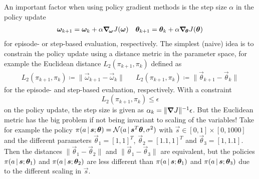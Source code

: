 			An important factor when using policy gradient methods is the step size \(\alpha\) in the policy update
			\begin{align*}
				\bm{\omega}_{k + 1} = \bm{\omega}_k + \alpha \grad_{\!\bm{\omega}} J(\bm{\omega})
				 &  &
				\bm{\theta}_{k + 1} = \bm{\theta}_k + \alpha \grad_{\!\bm{\theta}} J(\bm{\theta})
			\end{align*}
			for episode- or step-based evaluation, respectively. The simplest (naive) idea is to constrain the policy update using a distance metric in the parameter space, for example the Euclidean distance \( L_2(\pi_{k + 1}, \pi_k) \) defined as
			\begin{align*}
				L_2(\pi_{k + 1}, \pi_k) \coloneqq \lVert \vec{\omega}_{k + 1} - \vec{\omega}_k \rVert
				 &  &
				L_2(\pi_{k + 1}, \pi_k) \coloneqq \lVert \vec{\theta}_{k + 1} - \vec{\theta}_k \rVert
			\end{align*}
			for the episode- and step-based evaluation, respectively. With a constraint
			\begin{equation*}
				L_2(\pi_{k + 1}, \pi_k) \leq \epsilon
			\end{equation*}
			on the policy update, the step size is given as \( \alpha_k = \lVert \grad{J} \rVert^{-1} \epsilon \). But the Euclidean metric has the big problem if not being invariant to scaling of the variables! Take for example the policy \( \pi(a \,\vert\, \bm{s}; \bm{\theta}) = \mathcal{N}(a \,\vert\, \bm{s}^T \bm{\theta}, \sigma^2) \) with \( \vec{s} \in [0, 1] \times [0, 1000] \) and the different parameters \( \vec{\theta}_1 = [1, 1]^T \), \( \vec{\theta}_2 = [1.1, 1]^T \) and \( \vec{\theta}_3 = [1, 1.1] \). Then the distances \( \lVert \vec{\theta}_1 - \vec{\theta}_2 \rVert \) and \( \lVert \vec{\theta}_1 - \vec{\theta}_3 \rVert \) are equivalent, but the policies \( \pi(a \,\vert\, \bm{s}; \bm{\theta}_1) \) and \( \pi(a \,\vert\, \bm{s}; \bm{\theta}_2) \) are less different than \( \pi(a \,\vert\, \bm{s}; \bm{\theta}_1) \) and \( \pi(a \,\vert\, \bm{s}; \bm{\theta}_3) \) due to the different scaling in \(\vec{s}\).

